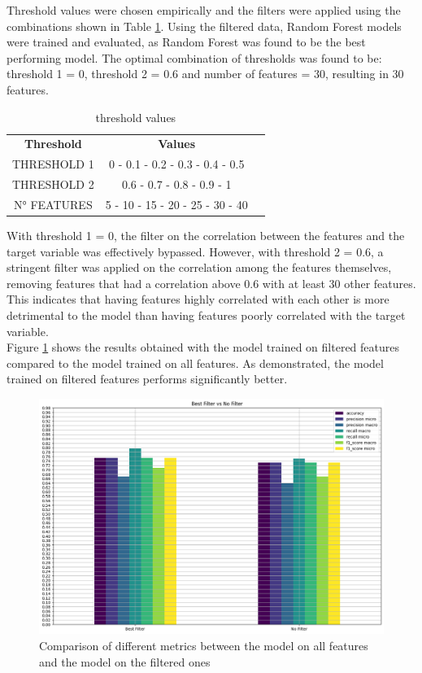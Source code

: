Threshold values were chosen empirically and the filters were applied using the combinations shown in Table \ref{tab:threshold_values}.
Using the filtered data, Random Forest models were trained and evaluated, as Random Forest was found to be the best performing model.
The optimal combination of thresholds was found to be: threshold 1 = 0, threshold 2 = 0.6 and number of features = 30, resulting in 30 features.

\begin{table}[h]
    \centering
    \small
    \begin{tabular}{|c|c|c|}
        \hline
        \textbf{Threshold} & \textbf{Values}                 \\
        THRESHOLD 1        & 0 - 0.1 - 0.2 - 0.3 - 0.4 - 0.5 \\
        THRESHOLD 2        & 0.6 - 0.7 - 0.8 - 0.9 - 1       \\
        N° FEATURES        & 5 - 10 - 15 - 20 - 25 - 30 - 40 \\
        \hline
    \end{tabular}
    \caption{threshold values}
    \label{tab:threshold_values}
\end{table}
\noindent
With threshold 1 = 0, the filter on the correlation between the features and the target variable was effectively bypassed.
However, with threshold 2 = 0.6, a stringent filter was applied on the correlation among the features themselves,
removing features that had a correlation above 0.6 with at least 30 other features. This indicates that having features
highly correlated with each other is more detrimental to the model than having features poorly correlated with the target variable.\\
Figure \ref{fig:comparison_model_on_all_features_vs_model_on_best} shows the results obtained with the model trained on filtered features
compared to the model trained on all features. As demonstrated, the model trained on filtered features performs significantly better.

\begin{figure}[H]
    \centering
    \includegraphics[width=0.8\columnwidth]{../images/model_on_all_features_vs_model_on_best.png}
    \caption{Comparison of different metrics between the model on all features and the model on the filtered ones}
    \label{fig:comparison_model_on_all_features_vs_model_on_best}
\end{figure}

